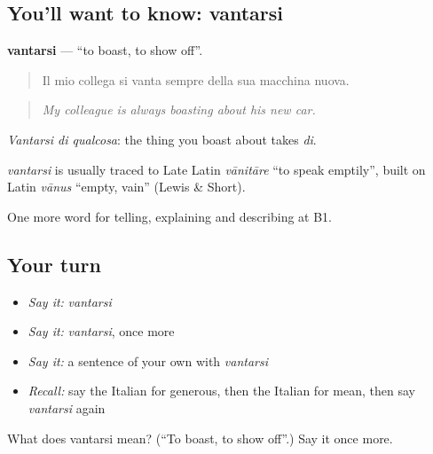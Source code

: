 \subsection*{You'll want to know: vantarsi}
\textbf{vantarsi} — \textquotedblleft{}to boast, to show off\textquotedblright{}.

\begin{quote}
Il mio collega si vanta sempre della sua macchina nuova.
\end{quote}

\begin{quote}
\emph{My colleague is always boasting about his new car.}
\end{quote}

\emph{Vantarsi di qualcosa}: the thing you boast about takes \emph{di}.

\begin{cousinweb}
\emph{vantarsi} is usually traced to Late Latin \emph{vānitāre} \textquotedblleft{}to speak emptily\textquotedblright{}, built on Latin \emph{vānus} \textquotedblleft{}empty, vain\textquotedblright{} (Lewis \& Short).
\end{cousinweb}

\begin{grammarlens}[title={What you've built}]
One more word for telling, explaining and describing at B1.
\end{grammarlens}

\subsection*{Your turn}
\begin{itemize}
\raggedright
  \item \emph{Say it:} \emph{vantarsi}
  \item \emph{Say it:} \emph{vantarsi}, once more
  \item \emph{Say it:} a sentence of your own with \emph{vantarsi}
  \item \emph{Recall:} say the Italian for generous, then the Italian for mean, then say \emph{vantarsi} again
\end{itemize}

\begin{tcolorbox}[breakable,colback=teal!4,colframe=teal!35!black,title={Before you move on}]
What does vantarsi mean? (\textquotedblleft{}To boast, to show off\textquotedblright{}.) Say it once more.
\end{tcolorbox}
